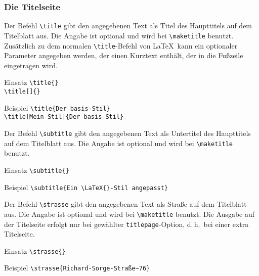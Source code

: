 \subsubsection{Die Titelseite}
\label{sec:New:Titelseite}

\DescribeMacro{\title}
Der Befehl \verb#\title# gibt den angegebenen Text als Titel des Haupttitels
auf dem Titelblatt aus.
Die Angabe ist optional und wird bei \verb#\maketitle#
benutzt.
Zusätzlich zu dem normalen \verb#\title#-Befehl von \LaTeX\ kann ein
optionaler Parameter angegeben werden, der einen Kurztext enthält, der
in die Fußzeile eingetragen wird.
\begin{einspiel}{Einsatz}
 \>\verb#\title{#\verb#}#\\
 \>\verb#\title[#\verb#]{#\verb#}#
\end{einspiel}
\begin{einspiel}{Beispiel}
 \>\verb#\title{Der basis-Stil}#\\
 \>\verb#\title[Mein Stil]{Der basis-Stil}#
\end{einspiel}

\DescribeMacro{\subtitle}
Der Befehl \verb#\subtitle# gibt den angegebenen Text als Untertitel des
Haupttitels auf dem Titelblatt aus.
Die Angabe ist optional und
wird bei \verb#\maketitle# benutzt.
\begin{einspiel}{Einsatz}
 \>\verb#\subtitle{#\verb#}#
\end{einspiel}
\begin{einspiel}{Beispiel}
 \>\verb#\subtitle{Ein \LaTeX{}-Stil angepasst}#
\end{einspiel}

\DescribeMacro{\strasse}
Der Befehl \verb#\strasse# gibt den angegebenen Text als Straße auf dem
Titelblatt aus.
Die Angabe ist optional und wird bei \verb#\maketitle#
benutzt.
Die Ausgabe auf der Titelseite erfolgt nur bei gewählter
\verb#titlepage#-Option, d.\,h.\ bei einer extra Titelseite.
\begin{einspiel}{Einsatz}
 \>\verb#\strasse{#\verb#}#
\end{einspiel}
\begin{einspiel}{Beispiel}
 \>\verb#\strasse{Richard-Sorge-Straße~76}#
\end{einspiel}

